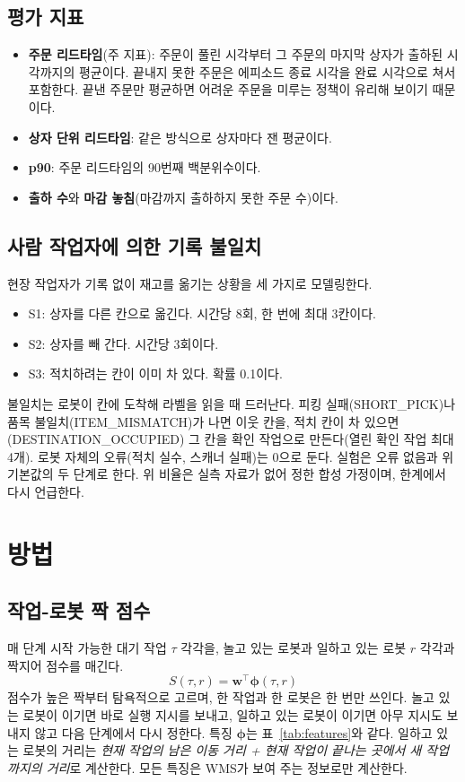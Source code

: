\documentclass[10pt,twocolumn]{article}
\begin{document}
\subsection{평가 지표}
\begin{itemize}
  \item \textbf{주문 리드타임}(주 지표): 주문이 풀린 시각부터 그 주문의 마지막 상자가 출하된 시각까지의 평균이다. 끝내지 못한 주문은 에피소드 종료 시각을 완료 시각으로 쳐서 포함한다. 끝낸 주문만 평균하면 어려운 주문을 미루는 정책이 유리해 보이기 때문이다.
  \item \textbf{상자 단위 리드타임}: 같은 방식으로 상자마다 잰 평균이다.
  \item \textbf{p90}: 주문 리드타임의 90번째 백분위수이다.
  \item \textbf{출하 수}와 \textbf{마감 놓침}(마감까지 출하하지 못한 주문 수)이다.
\end{itemize}

\subsection{사람 작업자에 의한 기록 불일치}
현장 작업자가 기록 없이 재고를 옮기는 상황을 세 가지로 모델링한다.
\begin{itemize}
  \item S1: 상자를 다른 칸으로 옮긴다. 시간당 8회, 한 번에 최대 3칸이다.
  \item S2: 상자를 빼 간다. 시간당 3회이다.
  \item S3: 적치하려는 칸이 이미 차 있다. 확률 0.1이다.
\end{itemize}
불일치는 로봇이 칸에 도착해 라벨을 읽을 때 드러난다.
피킹 실패(SHORT\_PICK)나 품목 불일치(ITEM\_MISMATCH)가 나면 이웃 칸을, 적치 칸이 차 있으면(DESTINATION\_OCCUPIED) 그 칸을 확인 작업으로 만든다(열린 확인 작업 최대 4개). %
로봇 자체의 오류(적치 실수, 스캐너 실패)는 0으로 둔다.
실험은 오류 없음과 위 기본값의 두 단계로 한다.
위 비율은 실측 자료가 없어 정한 합성 가정이며, 한계에서 다시 언급한다.

\section{방법}

\subsection{작업-로봇 짝 점수}
매 단계 시작 가능한 대기 작업 $\tau$ 각각을, 놀고 있는 로봇과 일하고 있는 로봇 $r$ 각각과 짝지어 점수를 매긴다.
\begin{equation}
  S(\tau, r) = \mathbf{w}^\top \boldsymbol{\phi}(\tau, r)
\end{equation}
점수가 높은 짝부터 탐욕적으로 고르며, 한 작업과 한 로봇은 한 번만 쓰인다.
놀고 있는 로봇이 이기면 바로 실행 지시를 보내고, 일하고 있는 로봇이 이기면 아무 지시도 보내지 않고 다음 단계에서 다시 정한다.
특징 $\boldsymbol{\phi}$는 표~\ref{tab:features}와 같다.
일하고 있는 로봇의 거리는 \emph{현재 작업의 남은 이동 거리 + 현재 작업이 끝나는 곳에서 새 작업까지의 거리}로 계산한다.
모든 특징은 WMS가 보여 주는 정보로만 계산한다.
\end{document}
